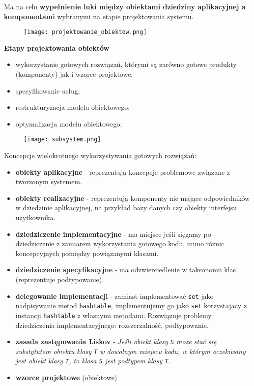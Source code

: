 \documentclass[../main.tex]{subfiles}
\begin{document}
    Ma na celu \textbf{wypełnienie luki między obiektami dziedziny aplikacyjnej a komponentami} wybranymi na etapie projektowania systemu.


    \begin{figure}[h]
        \texttt{[image: projektowanie\_obiektow.png]}
    \end{figure}

    \textbf{Etapy projektowania obiektów}
    \begin{itemize}
        \item wykorzystanie gotowych rozwiązań, którymi są zarówno
        gotowe produkty (komponenty) jak i wzorce projektowe;
        \item specyfikowanie usług;
        \item restrukturyzacja modelu obiektowego;
        \item optymalizacja modelu obiektowego;
    \end{itemize}

    \begin{figure}[H]
        \texttt{[image: subsystem.png]}
    \end{figure}

    Koncepcje wielokrotnego wykorzystywania gotowych rozwiązań:
    \begin{itemize}
        \item \textbf{obiekty aplikacyjne} - reprezentują koncepcje problemowe związane z tworzonym systemem.
        \item \textbf{obiekty realizacyjne} - reprezentują komponenty nie mające odpowiedników w
        dziedzinie aplikacyjnej, na przykład bazy danych czy obiekty interfejsu użytkownika.
        \item \textbf{dziedziczenie implementacyjne} - ma miejsce jeśli sięgamy po dziedziczenie z zamiarem wykorzystania
        gotowego kodu, mimo różnic koncepcyjnych pomiędzy powiązanymi klasami.
        \item \textbf{dziedziczenie specyfikacyjne} - ma odzwierciedlenie w taksonomii klas (reprezentuje podtypowanie).
        \item \textbf{delegowanie implementacji} - zamiast implementować
        \texttt{set} jako nadpisywanie metod \texttt{hashtable}, implementujemy go jako
        \texttt{set} korzystajacy z instancji \texttt{hashtable} z własnymi metodami.
        Rozwiązuje problemy dziedziczenia implementacyjnego: rozszerzalność, podtypowanie.
        \item \textbf{zasada zastępowania Liskov} - \textit{Jeśli obiekt klasy
        \texttt{S} może stać się substytutem obiektu klasy \texttt{T} w
        dowolnym miejscu kodu, w którym oczekiwany jest obiekt klasy \texttt{T},
        to klasa \texttt{S} jest podtypem klasy \texttt{T}.}
        \item \textbf{wzorce projektowe} (obiektowe)
    \end{itemize}
\end{document}
